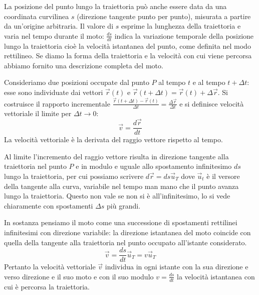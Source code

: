 \documentclass[class=book, crop=false, oneside, 12pt]{standalone}
\begin{document}
La posizione del punto lungo la traiettoria può anche essere data da una coordinata curvilinea \(s\) (direzione tangente punto per punto), misurata a partire da un'origine arbitraria. Il valore di \(s\) esprime la lunghezza della traiettoria e varia nel tempo durante il moto: \(\frac{ds}{dt}\) indica la variazione temporale della posizione lungo la traiettoria cioè la velocità istantanea del punto, come definita nel modo rettilineo.
Se diamo la forma della traiettoria e la velocità con cui viene percorsa abbiamo fornito una descrizione completa del moto.

Consideriamo due posizioni occupate dal punto \(P\) al tempo \(t\) e al tempo \(t + \Delta t\): esse sono individuate dai vettori \(\overrightarrow{r}(t)\) e \(\overrightarrow{r}(t + \Delta t) = \overrightarrow{r}(t) + \Delta \overrightarrow{r}\).
Si costruisce il rapporto incrementale \(\frac{\overrightarrow{r}(t+\Delta t) - \overrightarrow{r}(t)}{\Delta t} = \frac{\Delta \overrightarrow{r}}{\Delta t}\) e si definisce velocità vettoriale il limite per \(\Delta t \rightarrow 0\):
\begin{equation}
  \overrightarrow{v} = \frac{d \overrightarrow{r}}{dt}
\end{equation}
La velocità vettoriale è la derivata del raggio vettore rispetto al tempo.

Al limite l'incremento del raggio vettore risulta in direzione tangente alla traiettoria nel punto \(P\) e in modulo e uguale allo spostamento infinitesimo \(ds\) lungo la traiettoria,
per cui possiamo scrivere \(d \overrightarrow{r} = ds \overrightarrow{u}_T\) dove \(\overrightarrow{u}_t\) è il versore della tangente alla curva, variabile nel tempo man mano che il punto avanza lungo la traiettoria.
Questo non vale se non si è all'infinitesimo, lo si vede chiaramente con spostamenti \(\Delta s\) più grandi.

In sostanza pensiamo il moto come una successione di spostamenti rettilinei infinitesimi con direzione variabile: la direzione istantanea del moto coincide con quella della tangente alla traiettoria nel punto occupato all'istante considerato.
\begin{equation}
  \overrightarrow{v} = \frac{ds}{dt} \overrightarrow{u}_T = v \overrightarrow{u}_T
\end{equation}
Pertanto la velocità vettoriale \(\overrightarrow{v}\) individua in ogni istante con la sua direzione e verso direzione e il suo moto e con il suo modulo \(v = \frac{ds}{dt}\) la velocità istantanea con cui è percorsa la traiettoria.
\end{document}
